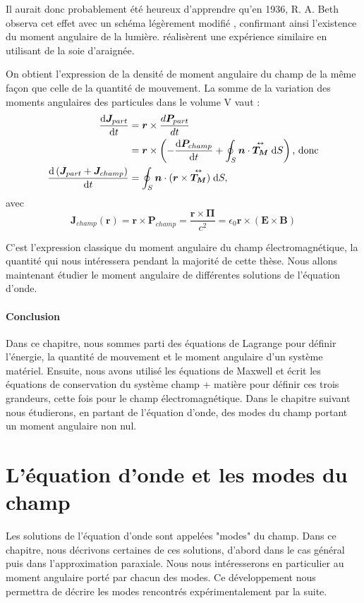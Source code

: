 Il aurait donc probablement été heureux d'apprendre qu'en 1936, R. A. Beth observa cet effet avec un schéma légèrement modifié , confirmant ainsi l'existence du moment angulaire de la lumière.  réalisèrent une expérience similaire en utilisant de la soie d'araignée.\par
On obtient l'expression de la densité de moment angulaire du champ de la même façon que celle de la quantité de mouvement. La somme de la variation des moments angulaires des particules dans le volume V vaut :
\begin{align}
\frac{\mathrm{d}\bm{J}_{part}}{\mathrm{d} t} &= \bm{r}\times\frac{d\bm{P}_{part}}{dt} \\
&= \bm{r}\times\left(-\frac{\mathrm{d} \bm{P}_{champ}}{\mathrm{d} t} + \oint_S \bm{n}\cdot\overset{\text{\tiny$\bm{\leftrightarrow}$}}{\bm{T_M}}\;\mathrm{d} S\right)\text{, donc} \\
\frac{\mathrm{d}\left(\bm{J}_{part}+\bm{J}_{champ}\right)}{\mathrm{d} t} &= \oint_S \bm{n}\cdot(\bm{r}\times\overset{\text{\tiny$\bm{\leftrightarrow}$}}{\bm{T_M}})\;\mathrm{d} S,
\end{align}
avec
\begin{equation}
\bm{J}_{champ}(\bm{r})=\bm{r}\times{\bm{P}_{champ}}=\frac{\bm{r}\times\bm{\Pi}}{c^2} = \epsilon_0\bm{r}\times(\bm{E}\times\bm{B})
\label{Eq.DefJEM}
\end{equation}

C'est l'expression classique du moment angulaire du champ électromagnétique, la quantité qui nous intéressera pendant la majorité de cette thèse. Nous allons maintenant étudier le moment angulaire de différentes solutions de l'équation d'onde.

\subsubsection{Conclusion}
Dans ce chapitre, nous sommes parti des équations de Lagrange pour définir l'énergie, la quantité de mouvement et le moment angulaire d'un système matériel. Ensuite, nous avons utilisé les équations de Maxwell et écrit les équations de conservation du système {champ + matière} pour définir ces trois grandeurs, cette fois pour le champ électromagnétique. Dans le chapitre suivant nous étudierons, en partant de l'équation d'onde, des modes du champ portant un moment angulaire non nul.

\chapter{L'équation d'onde et les modes du champ}
\label{ch:modes}
Les solutions de l'équation d'onde sont appelées "modes" du champ. Dans ce chapitre, nous décrivons certaines de ces solutions, d'abord dans le cas général puis dans l'approximation paraxiale. Nous nous intéresserons en particulier au moment angulaire porté par chacun des modes. Ce développement nous permettra de décrire les modes rencontrés expérimentalement par la suite.
